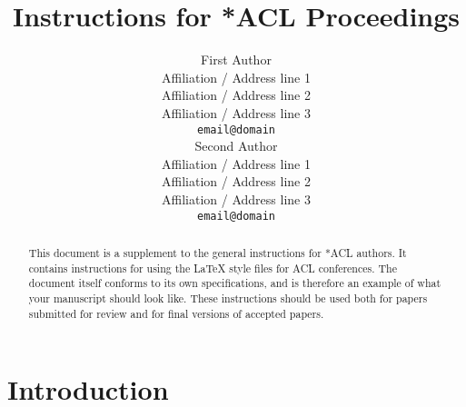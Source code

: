 \documentclass[11pt]{article}
\title{Instructions for *ACL Proceedings}
\author{First Author \\
  Affiliation / Address line 1 \\
  Affiliation / Address line 2 \\
  Affiliation / Address line 3 \\
  \texttt{email@domain} \\\And
  Second Author \\
  Affiliation / Address line 1 \\
  Affiliation / Address line 2 \\
  Affiliation / Address line 3 \\
  \texttt{email@domain} \\}
\begin{document}
\maketitle
\begin{abstract}
This document is a supplement to the general instructions for *ACL authors. It contains instructions for using the \LaTeX{} style files for ACL conferences.
The document itself conforms to its own specifications, and is therefore an example of what your manuscript should look like.
These instructions should be used both for papers submitted for review and for final versions of accepted papers.
\end{abstract}

\section{Introduction}
\end{document}
